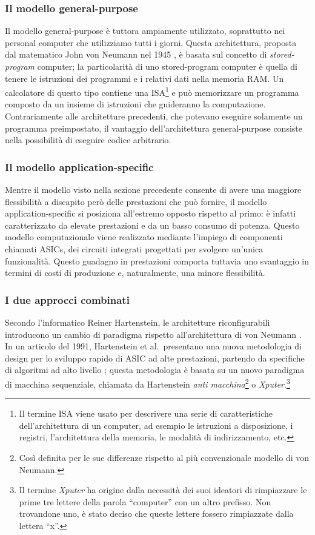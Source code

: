 \subsubsection{Il modello general-purpose}
Il modello general-purpose è tuttora ampiamente utilizzato, soprattutto nei personal
computer che utilizziamo tutti i giorni. Questa architettura, proposta dal matematico
John von Neumann nel 1945 \cite{First-Draft-Report-EDVAC}, è basata sul concetto di
\emph{stored-program} computer; la particolarità di uno stored-program computer è quella
di tenere le istruzioni dei programmi e i relativi dati nella memoria RAM. Un calcolatore di
questo tipo contiene una \ac{ISA}\footnote{Il termine \acl{ISA} viene usato per descrivere
una serie di caratteristiche dell'architettura di un computer, ad esempio le istruzioni
a disposizione, i registri, l'architettura della memoria, le modalità di indirizzamento, etc.}
e può memorizzare un programma composto da un insieme di istruzioni che guideranno
la computazione. Contrariamente alle architetture precedenti, che potevano eseguire
solamente un programma preimpostato, il vantaggio dell'architettura general-purpose consiste
nella possibilità di eseguire codice arbitrario.

\subsubsection{Il modello application-specific}
Mentre il modello visto nella sezione precedente consente di avere una maggiore
flessibilità a discapito però delle prestazioni che può fornire, il modello
application-specific si posiziona all'estremo opposto rispetto al primo: è infatti
caratterizzato da elevate prestazioni e da un basso consumo di potenza. Questo modello
computazionale viene realizzato mediante l'impiego di componenti chiamati \acp{ASIC},
dei circuiti integrati progettati per svolgere un'unica funzionalità. Questo guadagno
in prestazioni comporta tuttavia uno svantaggio in termini di costi di produzione e,
naturalmente, una minore flessibilità.


\subsubsection{I due approcci combinati}
Secondo l'informatico Reiner Hartenstein, le architetture riconfigurabili introducono un
cambio di paradigma rispetto all'architettura di von Neumann
\cite{HartensteinParadigmShift}. In un articolo del 1991, Hartenstein et al.~presentano
una nuova metodologia di design per lo sviluppo rapido di \ac{ASIC} ad alte prestazioni,
partendo da specifiche di algoritmi ad alto livello \cite{HartensteinNovelASICDesign};
questa metodologia è basata su un nuovo paradigma di macchina sequenziale, chiamata da
Hartenstein \emph{anti macchina}\footnote{Così definita per le sue differenze rispetto al
più convenzionale modello di von Neumann.} o \emph{Xputer}.\footnote{Il termine
\emph{Xputer} ha origine dalla necessità dei suoi ideatori di rimpiazzare le prime tre
lettere della parola ``computer'' con un altro prefisso. Non trovandone uno, è stato
deciso che queste lettere fossero rimpiazzate dalla lettera ``x''.}

